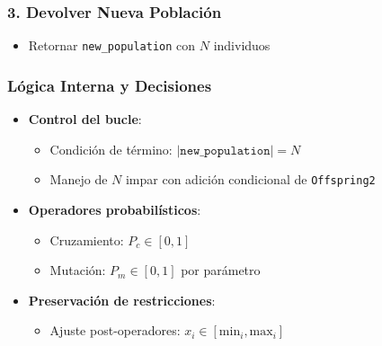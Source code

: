 \vspace{0.5em}
\noindent{}

\vspace{0.5em}
\noindent{}

\subsubsection*{3. Devolver Nueva Población}
\begin{itemize}
    \item Retornar \texttt{new\_population} con $N$ individuos
\end{itemize}

\subsubsection{Lógica Interna y Decisiones}
\begin{itemize}
    \item \textbf{Control del bucle}:
    \begin{itemize}
        \item Condición de término: $|\texttt{new\_population}| = N$
        \item Manejo de $N$ impar con adición condicional de \texttt{Offspring2}
    \end{itemize}

    \item \textbf{Operadores probabilísticos}:
    \begin{itemize}
        \item Cruzamiento: $P_c \in [0,1]$
        \item Mutación: $P_m \in [0,1]$ por parámetro
    \end{itemize}

    \item \textbf{Preservación de restricciones}:
    \begin{itemize}
        \item Ajuste post-operadores: $x_i \in [\text{min}_i, \text{max}_i]$
    \end{itemize}
\end{itemize}

